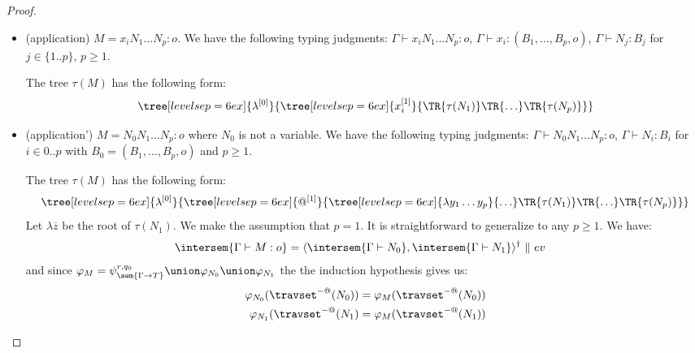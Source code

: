 \begin{proof}
\begin{itemize}
    \item (application) $M = x_i N_1 \ldots N_p :o$.
    We have the following typing judgments: $\Gamma \vdash x_i N_1 \ldots N_p :
    o$, $\Gamma \vdash x_i : (B_1,\ldots,B_p,o)$, $\Gamma \vdash N_j : B_j$ for $j\in \{1..p\}$, $p\geq 1$.

    The tree $\tau(M)$ has the following form:
    $$ \tree[levelsep=6ex]{\lambda^{[0]}}
        { \tree[levelsep=6ex]{x_i^{[1]}}
            {   \TR{\tau(N_1)} \TR{\ldots} \TR{\tau(N_p)}}}
    $$


    \item (application') $M = N_0 N_1 \ldots N_p :o$ where $N_0$ is not a variable.
    We have the following typing judgments: $\Gamma \vdash N_0 N_1 \ldots N_p :
    o$, $\Gamma \vdash N_i : B_i$ for $i\in 0..p$ with $B_0 =
    (B_1,\ldots,B_p,o)$ and $p\geq 1$.

    The tree $\tau(M)$ has the following form:
    $$ \tree[levelsep=6ex]{\lambda^{[0]}}
        { \tree[levelsep=6ex]{@^{[1]}}
            {
            \tree[levelsep=6ex]{\lambda y_1 \ldots y_p}{\ldots}
            \TR{\tau(N_1)} \TR{\ldots} \TR{\tau(N_p)}}}
    $$
    Let $\lambda \overline{z}$ be the root of $\tau(N_1)$. We
    make the assumption that $p=1$. It is straightforward to
    generalize to any $p\geq1$. We have:
    \begin{align*}
    \intersem{\Gamma \vdash M : o}
            &=  \langle \intersem{\Gamma \vdash N_0}, \intersem{\Gamma \vdash N_1} \rangle^\dagger\ \| \ ev
    \end{align*}
    and since $\varphi_M = \psi_{\sem{\Gamma\rightarrow
    T}}^{r,q_0} \union \varphi_{N_0} \union \varphi_{N_1}$ the
    the induction hypothesis gives us:
    \begin{align}
    \varphi_{N_0} (\travset^{-@}(N_0)) &= \varphi_{M} (\travset^{-@}(N_0)) \label{eqn:ih_1} \\
    \varphi_{N_1}(\travset^{-@}(N_1) &= \varphi_{M}(\travset^{-@}(N_1)) \label{eqn:ih_2}
    \end{align}



\end{itemize}
\end{proof}
